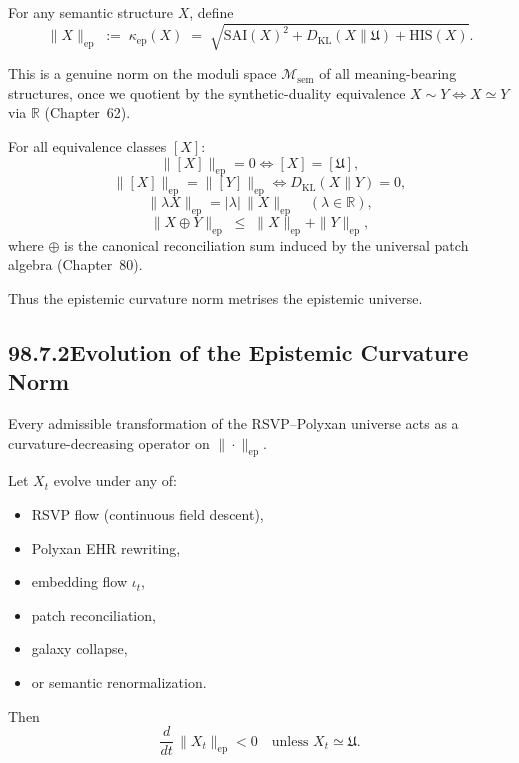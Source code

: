 \begin{definition}
For any semantic structure $X$, define
\[
\|X\|_{\mathrm{ep}}
  \;:=\;
  \kappa_{\mathrm{ep}}(X)
  \;=\;
  \sqrt{
    \mathrm{SAI}(X)^2
    +
    D_{\mathrm{KL}}(X\|\mathfrak{U})
    +
    \mathrm{HIS}(X)
  }.
\]
\end{definition}

This is a genuine norm on the moduli space $\mathcal{M}_{\mathrm{sem}}$
of all meaning-bearing structures,
once we quotient by the synthetic-duality equivalence
$X\sim Y \iff X\simeq Y$ via $\mathbb{R}$ (Chapter~62).

\begin{theorem}
For all equivalence classes $[X]$:
\[
\|[X]\|_{\mathrm{ep}} = 0 \iff [X] = [\mathfrak{U}],
\]
\[
\|[X]\|_{\mathrm{ep}} = \|[Y]\|_{\mathrm{ep}} \iff 
  D_{\mathrm{KL}}(X\|Y)=0,
\]
\[
\|\lambda X\|_{\mathrm{ep}}
  = |\lambda|\,\|X\|_{\mathrm{ep}}
  \quad
  (\lambda\in\mathbb{R}),
\]
\[
\|X\oplus Y\|_{\mathrm{ep}}
  \;\le\;
  \|X\|_{\mathrm{ep}}
  + \|Y\|_{\mathrm{ep}},
\]
where $\oplus$ is the canonical reconciliation sum
induced by the universal patch algebra (Chapter~80).
\end{theorem}

Thus the epistemic curvature norm metrises the epistemic universe.

\subsection*{98.7.2\quad Evolution of the Epistemic Curvature Norm}

Every admissible transformation of the RSVP--Polyxan universe
acts as a curvature-decreasing operator on $\|\cdot\|_{\mathrm{ep}}$.

\begin{theorem}
Let $X_t$ evolve under any of:
\begin{itemize}
\item RSVP flow (continuous field descent),
\item Polyxan EHR rewriting,
\item embedding flow $\iota_t$,
\item patch reconciliation,
\item galaxy collapse,
\item or semantic renormalization.
\end{itemize}
Then
\[
\frac{d}{dt}\,\|X_t\|_{\mathrm{ep}} < 0
\quad\text{unless } X_t\simeq\mathfrak{U}.
\]
\end{theorem}

